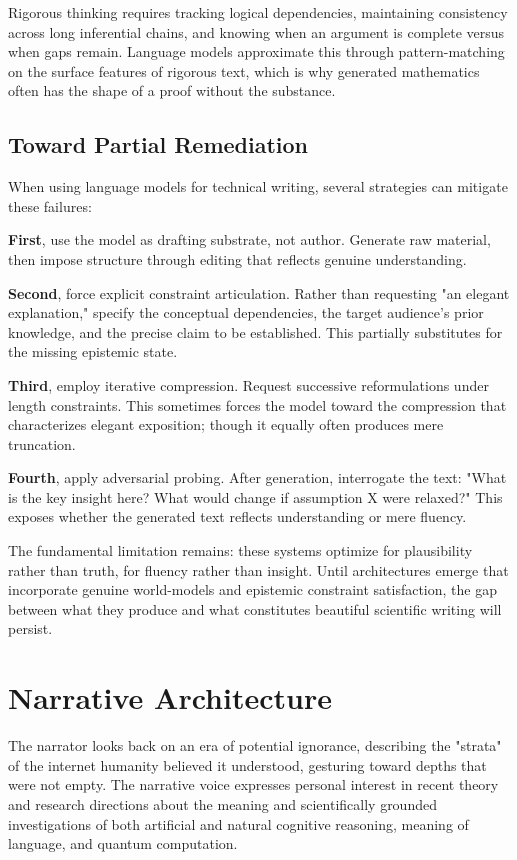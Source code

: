 Rigorous thinking requires tracking logical dependencies, maintaining consistency across long inferential chains, and knowing when an argument is complete versus when gaps remain. Language models approximate this through pattern-matching on the surface features of rigorous text, which is why generated mathematics often has the shape of a proof without the substance.

\subsection*{Toward Partial Remediation}

When using language models for technical writing, several strategies can mitigate these failures:

\textbf{First}, use the model as drafting substrate, not author. Generate raw material, then impose structure through editing that reflects genuine understanding.

\textbf{Second}, force explicit constraint articulation. Rather than requesting "an elegant explanation," specify the conceptual dependencies, the target audience's prior knowledge, and the precise claim to be established. This partially substitutes for the missing epistemic state.

\textbf{Third}, employ iterative compression. Request successive reformulations under length constraints. This sometimes forces the model toward the compression that characterizes elegant exposition; though it equally often produces mere truncation.

\textbf{Fourth}, apply adversarial probing. After generation, interrogate the text: "What is the key insight here? What would change if assumption X were relaxed?" This exposes whether the generated text reflects understanding or mere fluency.

The fundamental limitation remains: these systems optimize for plausibility rather than truth, for fluency rather than insight. Until architectures emerge that incorporate genuine world-models and epistemic constraint satisfaction, the gap between what they produce and what constitutes beautiful scientific writing will persist.

\section*{Narrative Architecture}

The narrator looks back on an era of potential ignorance, describing the "strata" of the internet humanity believed it understood, gesturing toward depths that were not empty. The narrative voice expresses personal interest in recent theory and research directions about the meaning and scientifically grounded investigations of both artificial and natural cognitive reasoning, meaning of language, and quantum computation.

